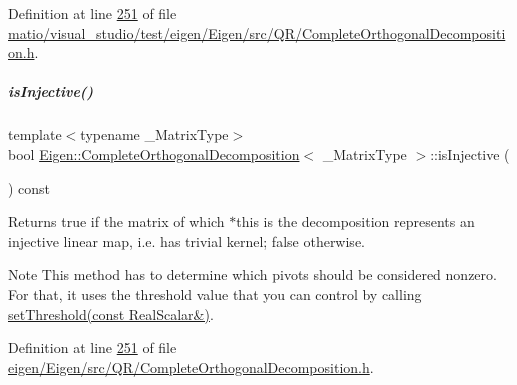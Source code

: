 Definition at line \hyperlink{matio_2visual__studio_2test_2eigen_2_eigen_2src_2_q_r_2_complete_orthogonal_decomposition_8h_source_l00251}{251} of file \hyperlink{matio_2visual__studio_2test_2eigen_2_eigen_2src_2_q_r_2_complete_orthogonal_decomposition_8h_source}{matio/visual\+\_\+studio/test/eigen/\+Eigen/src/\+Q\+R/\+Complete\+Orthogonal\+Decomposition.\+h}.

\mbox{\label{group___q_r___module_a2740067b81ec3e0ad20a2bea9a5a475f}} 
\subparagraph{\texorpdfstring{is\+Injective()}{isInjective()}\hspace{0.1cm}{\footnotesize\ttfamily [2/2]}}
{\footnotesize\ttfamily template$<$typename \+\_\+\+Matrix\+Type$>$ \\
bool \hyperlink{group___q_r___module_class_eigen_1_1_complete_orthogonal_decomposition}{Eigen\+::\+Complete\+Orthogonal\+Decomposition}$<$ \+\_\+\+Matrix\+Type $>$\+::is\+Injective (\begin{DoxyParamCaption}{ }\end{DoxyParamCaption}) const\hspace{0.3cm}{\ttfamily [inline]}}

\begin{DoxyReturn}{Returns}
true if the matrix of which $\ast$this is the decomposition represents an injective linear map, i.\+e. has trivial kernel; false otherwise.
\end{DoxyReturn}
\begin{DoxyNote}{Note}
This method has to determine which pivots should be considered nonzero. For that, it uses the threshold value that you can control by calling \hyperlink{group___q_r___module_aa9c9f7cbde9d58ca5552381b70ad8d82}{set\+Threshold(const Real\+Scalar\&)}. 
\end{DoxyNote}


Definition at line \hyperlink{eigen_2_eigen_2src_2_q_r_2_complete_orthogonal_decomposition_8h_source_l00251}{251} of file \hyperlink{eigen_2_eigen_2src_2_q_r_2_complete_orthogonal_decomposition_8h_source}{eigen/\+Eigen/src/\+Q\+R/\+Complete\+Orthogonal\+Decomposition.\+h}.

